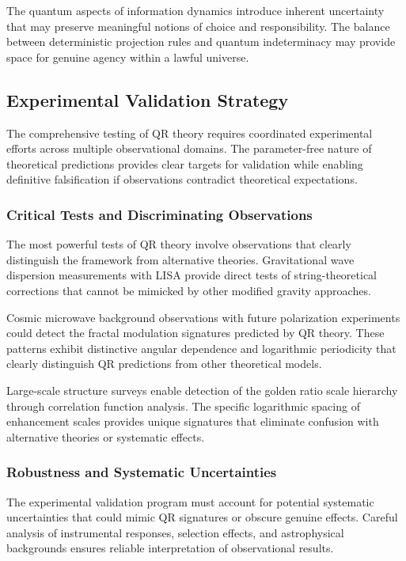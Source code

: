 The quantum aspects of information dynamics introduce inherent uncertainty that may preserve meaningful notions of choice and responsibility. The balance between deterministic projection rules and quantum indeterminacy may provide space for genuine agency within a lawful universe.

\subsection{Experimental Validation Strategy}
\label{subsec:validation-strategy}

The comprehensive testing of QR theory requires coordinated experimental efforts across multiple observational domains. The parameter-free nature of theoretical predictions provides clear targets for validation while enabling definitive falsification if observations contradict theoretical expectations.

\subsubsection{Critical Tests and Discriminating Observations}
\label{subsubsec:critical-tests}

The most powerful tests of QR theory involve observations that clearly distinguish the framework from alternative theories. Gravitational wave dispersion measurements with LISA provide direct tests of string-theoretical corrections that cannot be mimicked by other modified gravity approaches.

Cosmic microwave background observations with future polarization experiments could detect the fractal modulation signatures predicted by QR theory. These patterns exhibit distinctive angular dependence and logarithmic periodicity that clearly distinguish QR predictions from other theoretical models.

Large-scale structure surveys enable detection of the golden ratio scale hierarchy through correlation function analysis. The specific logarithmic spacing of enhancement scales provides unique signatures that eliminate confusion with alternative theories or systematic effects.

\subsubsection{Robustness and Systematic Uncertainties}
\label{subsubsec:robustness-systematics}

The experimental validation program must account for potential systematic uncertainties that could mimic QR signatures or obscure genuine effects. Careful analysis of instrumental responses, selection effects, and astrophysical backgrounds ensures reliable interpretation of observational results.

